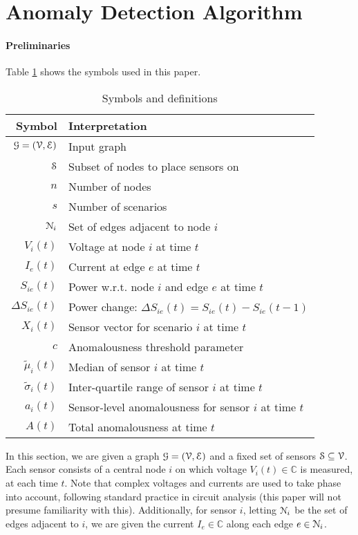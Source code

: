 

\section{\methodD Anomaly Detection Algorithm}

\paragraph{Preliminaries} Table \ref{tab:dfn} shows the symbols used in this paper. 
\setlength{\tabcolsep}{6pt}
\begin{table}[htbp]
\small
\centering
	\caption{Symbols and definitions \label{tab:dfn}}
	\begin{tabular}{ @{}rl@{} }  
	\toprule
	\textbf{Symbol} & \textbf{Interpretation} \\ \midrule
		$\G=(\V,\E)$ & Input graph \\
		$\S$ & Subset of nodes to place sensors on\\
		$n$ & Number of nodes \\
		$s$ & Number of scenarios \\
		$\N_i$ & Set of edges adjacent to node $i$ \\
		$V_i(t)$ & Voltage at node $i$ at time $t$\\
		$I_e(t)$ & Current at edge $e$ at time $t$\\
		$S_{ie}(t)$ & Power w.r.t. node $i$ and edge $e$ at time $t$\\
		$\Delta S_{ie}(t)$ & Power change: $\Delta S_{ie}(t) =  S_{ie}(t) - S_{ie}(t-1)$\\
		$X_{i}(t)$ & Sensor vector for scenario $i$ at time $t$ \\
		$c$ & Anomalousness threshold parameter \\
		$\tilde{\mu}_i(t)$ & Median of sensor $i$ at time $t$\\
		$\tilde{\sigma}_i(t)$ & Inter-quartile range of sensor $i$ at time $t$\\
		$a_i(t)$ & Sensor-level anomalousness for sensor $i$ at time $t$\\
		$A(t)$ & Total anomalousness at time $t$\\
	\bottomrule
	\end{tabular} 
\end{table}

In this section, we are given a graph $\G=(\V,\E)$ and a fixed set of sensors $\S \subseteq \V$. Each sensor consists of a central node $i$ on which voltage $V_i(t) \in \mathbb{C}$ is measured, at each time $t$. Note that complex voltages and currents are used to take phase into account, following standard practice in circuit analysis (this paper will not presume familiarity with this). Additionally, for sensor $i$, letting $\N_i$ be the set of edges adjacent to $i$, we are given the current $I_e \in \mathbb{C}$ along each edge $e \in \N_i$. 

